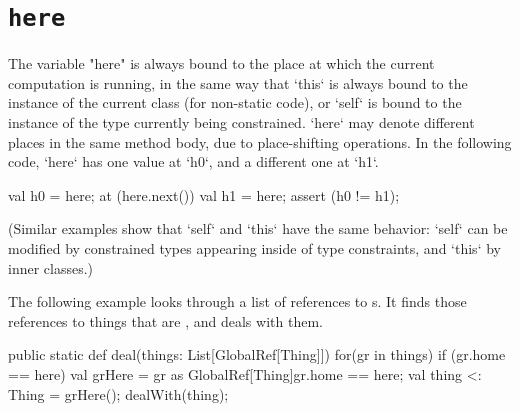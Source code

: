 \section{{\tt here}}\label{Here}

The variable \xcd"here" is always bound to the place at which the current
computation is running, in the same way that \xcd`this` is always bound to the
instance of the current class (for non-static code), or \xcd`self` is bound to
the instance of the type currently being constrained.  
\xcd`here` may denote different places in the same method body, due to
place-shifting operations. In the following code, \xcd`here` has one value at
\xcd`h0`, and a different one at \xcd`h1`. 
\begin{xten}
val h0 = here;
at (here.next()) {
  val h1 = here; 
  assert (h0 != h1);
}
\end{xten}
\noindent
(Similar examples show that \xcd`self` and \xcd`this` have the same behavior:
\xcd`self` can be modified by constrained types appearing inside of type
constraints, and \xcd`this` by inner classes.)



The following example looks through a list of references to s.  
It finds those references to things that are , and deals with them.  
\begin{xten}
  public static def deal(things: List[GlobalRef[Thing]]) {
     for(gr in things) {
        if (gr.home == here) {
           val grHere = 
               gr as GlobalRef[Thing]{gr.home == here};
           val thing <: Thing = grHere();
           dealWith(thing);
        }
     }
  }
\end{xten}



